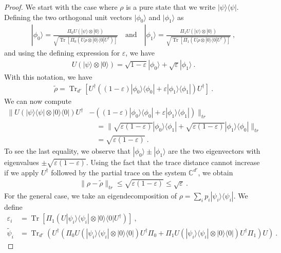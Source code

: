 \documentclass[12pt]{report}
\theoremstyle{plain}
\theoremstyle{definition}
\newcommand{\C}{{\mathbb C}}
\newcommand{\eps}{\varepsilon}
\renewcommand{\ket}[1]{|#1\rangle}
\newcommand{\ketbra}[2]{|#1\rangle\!\langle#2|}
\newcommand{\proj}[1]{\ketbra{#1}{#1}}
\newcommand{\Tr}{\operatorname{Tr}}
\begin{document}
\sloppy

\begin{proof}
We start with the case where $\rho$ is a pure state that we write $\proj{\psi}$.
Defining the two orthogonal unit vectors $\ket{\phi_0}$ and $\ket{\phi_1}$ as
\begin{align*}
\ket{\phi_0} = \frac{\Pi_{0} U (\ket{\psi} \otimes \ket{0})}{\sqrt{\Tr[\Pi_0 (U \rho \otimes \proj{0} U^{\dagger})]}} \quad \text{and} \quad \ket{\phi_1} = \frac{\Pi_{1} U (\ket{\psi} \otimes \ket{0})}{\sqrt{\Tr[\Pi_1 (U \rho \otimes \proj{0} U^{\dagger})]}} \ ,
\end{align*}
and using the defining expression for $\eps$, we have
\begin{align*}
U (\ket{\psi} \otimes \ket{0}) = \sqrt{1-\eps} \ket{\phi_0} + \sqrt{\eps} \ket{\phi_1} \ .
\end{align*}
With this notation, we have
\begin{align*}
\tilde{\rho} = \Tr_{d'}\left[ U^{\dagger} \left( (1-\eps) \proj{\phi_0} + \eps \proj{\phi_1} \right) U^{\dagger} \right] \ .
\end{align*}
We can now compute
\begin{align*}
\| U (\proj{\psi} \otimes \proj{0}) U^{\dagger} & - \left((1-\eps) \proj{\phi_0} + \eps \proj{\phi_1} \right) \|_{tr}\\ 
& \quad =  \| \sqrt{\eps (1-\eps)} \ketbra{\phi_0}{\phi_1} + \sqrt{\eps(1-\eps)} \ketbra{\phi_1}{\phi_0} \|_{tr} \\
& \quad = \sqrt{\eps(1-\eps)} \ .
\end{align*}
To see the last equality, we observe that $\ket{\phi_0} \pm \ket{\phi_1}$ are the two eigenvectors with eigenvalues $\pm \sqrt{\eps(1-\eps)}$.
Using the fact that the trace distance cannot increase if we apply $U^{\dagger}$ followed by the partial trace on the system $\C^{d'}$,  we obtain
\begin{align}
\label{eq:aagan_pure}
\| \rho - \tilde{\rho} \|_{tr} \leq \sqrt{\eps(1-\eps)} \leq \sqrt{\eps} \ .
\end{align}
For the general case, we take an eigendecomposition of $\rho = \sum_i p_i \proj{\psi_i}$. We define
\begin{align*}
\eps_i &= \Tr[\Pi_1 (U \proj{\psi_i} \otimes \proj{0} U^{\dagger})] \ , \\
 \tilde{\psi}_i &= \Tr_{d'}\left(U^{\dagger} \left( \Pi_0 U (\proj{\psi_i} \otimes \proj{0}) U^{\dagger} \Pi_0  +  \Pi_1 U (\proj{\psi_i} \otimes \proj{0}) U^{\dagger} \Pi_1 \right) U \right) \ .
\end{align*}

\end{proof}
\end{document}
